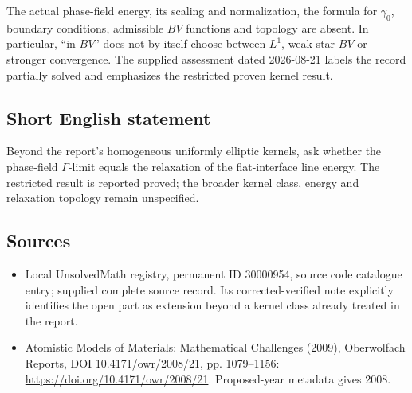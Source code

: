 \documentclass[11pt]{article}
\begin{document}
The actual phase-field energy, its scaling and normalization, the formula for $\gamma_0$, boundary conditions, admissible $BV$ functions and topology are absent. In particular, ``in $BV$'' does not by itself choose between $L^1$, weak-star $BV$ or stronger convergence. The supplied assessment dated 2026-08-21 labels the record partially solved and emphasizes the restricted proven kernel result.
\subsection{Short English statement}
Beyond the report's homogeneous uniformly elliptic kernels, ask whether the phase-field $\Gamma$-limit equals the relaxation of the flat-interface line energy. The restricted result is reported proved; the broader kernel class, energy and relaxation topology remain unspecified.
\subsection{Sources}
\begin{itemize}
\item Local UnsolvedMath registry, permanent ID 30000954, source code catalogue entry; supplied complete source record. Its corrected-verified note explicitly identifies the open part as extension beyond a kernel class already treated in the report.
\item Atomistic Models of Materials: Mathematical Challenges (2009), Oberwolfach Reports, DOI 10.4171/owr/2008/21, pp. 1079--1156: \url{https://doi.org/10.4171/owr/2008/21}. Proposed-year metadata gives 2008.
\end{itemize}
\end{document}
